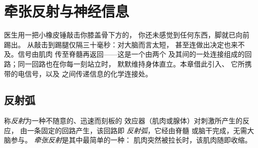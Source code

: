 \chapter{牵张反射与神经信息}\label{ch:g12:stretch-reflex}

医生用一把小橡皮锤敲击你膝盖骨下方的，
你还未感觉到任何东西，脚就已向前踢出。
从敲击到踢腿仅隔三十毫秒：对大脑而言太短，
甚至连做出决定也来不及。信号由肌肉
传至脊髓再返回——这是一个由两个
及其间的一处连接组成的回路；同一回路也在你每一刻站立时，
默默维持身体直立。本章借此引入、
它所携带的电信号，以及
之间传递信息的化学连接处。

\section{反射弧}

\begin{definition}[反射]\label{def:g12:stretch-reflex:reflex}
称\emph{反射}为一种不随意的、迅速而刻板的
效应器（肌肉或腺体）对刺激所产生的反应，
由一条固定的回路产生，该回路即
\emph{反射弧}，它经由脊髓
或脑干完成，无需大脑参与。
\emph{牵张反射}是其中最简单的一种：
肌肉突然被拉长时，该肌肉随即收缩。
\end{definition}

